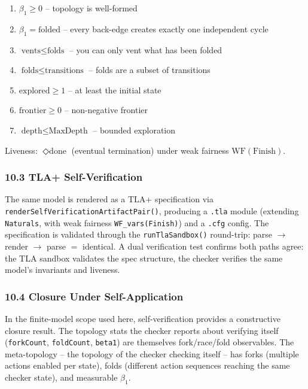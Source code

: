 \documentclass[
  11pt,
]{article}
\begin{document}
\begin{enumerate}
\def\labelenumi{\arabic{enumi}.}
\item
  \(\beta_1 \geq 0\) -- topology is well-formed
\item
  \(\beta_1 = \text{folded}\) -- every back-edge creates exactly one
  independent cycle
\item
  \(\text{vents} \leq \text{folds}\) -- you can only vent what has been
  folded
\item
  \(\text{folds} \leq \text{transitions}\) -- folds are a subset of
  transitions
\item
  \(\text{explored} \geq 1\) -- at least the initial state
\item
  \(\text{frontier} \geq 0\) -- non-negative frontier
\item
  \(\text{depth} \leq \text{MaxDepth}\) -- bounded exploration
\end{enumerate}

Liveness: \(\Diamond\text{done}\) (eventual termination) under weak
fairness \(\text{WF}(\text{Finish})\).

\subsubsection{10.3 TLA+ Self-Verification}\label{tla-self-verification}

The same model is rendered as a TLA+ specification via
\texttt{renderSelfVerificationArtifactPair()}, producing a \texttt{.tla}
module (extending \texttt{Naturals}, with weak fairness
\texttt{WF\_vars(Finish)}) and a \texttt{.cfg} config. The specification
is validated through the \texttt{runTlaSandbox()} round-trip: parse
\(\to\) render \(\to\) parse \(=\) identical. A dual verification test
confirms both paths agree: the TLA sandbox validates the spec structure,
the checker verifies the same model's invariants and liveness.

\subsubsection{10.4 Closure Under
Self-Application}\label{closure-under-self-application}

In the finite-model scope used here, self-verification provides a
constructive closure result. The topology stats the checker reports
about verifying itself (\texttt{forkCount}, \texttt{foldCount},
\texttt{beta1}) are themselves fork/race/fold observables. The
meta-topology -- the topology of the checker checking itself -- has
forks (multiple actions enabled per state), folds (different action
sequences reaching the same checker state), and measurable \(\beta_1\).
\end{document}
